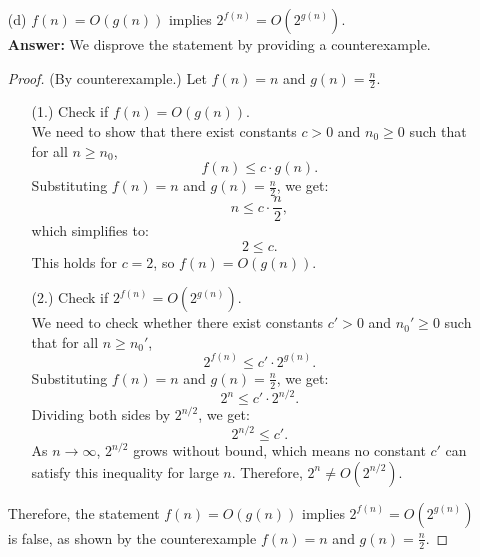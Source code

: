 \documentclass[12pt]{article}
\theoremstyle{plain}
\begin{document}
\begin{itemize}
\begin{proof}
            \textbf{Upper bound:} We first check if the upper bound \( n + n^2 \leq c_2 \cdot n \) holds for large \( n \). For large \( n \), \( n^2 \) dominates \( n \), so \( n + n^2 \) grows like \( n^2 \), which cannot be bounded by \( c_2 \cdot n \) for any constant \( c_2 \). Therefore, the upper bound fails.

            \textbf{Lower bound:} The lower bound \( n + n^2 \geq c_1 \cdot n \) holds for sufficiently large \( n \), since \( n^2 \) is positive and dominates \( n \), ensuring that \( n + n^2 \geq c_1 \cdot n \).

            Since the upper bound fails, we conclude that \( f(n) + g(n) \neq \Theta(\min(f(n), g(n))) \). Therefore, the original statement is false.
        \end{proof}
        \newpage

    \item[(d)] $f(n)= O(g(n))$ implies $2^{f(n)} = O(2^{g(n)}).$ \\
        \textbf{Answer:} We disprove the statement by providing a counterexample.
        \begin{proof} (By counterexample.) Let \( f(n) = n \) and \( g(n) = \frac{n}{2} \).
        \begin{itemize}
            \item[(1.)] Check if \( f(n) = O(g(n)) \). \\
            We need to show that there exist constants \( c > 0 \) and \( n_0 \geq 0 \) such that for all \( n \geq n_0 \),
            \[ f(n) \leq c \cdot g(n). \] 
            Substituting \( f(n) = n \) and \( g(n) = \frac{n}{2} \), we get:
            \[ n \leq c \cdot \frac{n}{2}, \]
            which simplifies to:
            \[ 2 \leq c. \]
            This holds for \( c = 2 \), so \( f(n) = O(g(n)) \).
            \item[(2.)] Check if \( 2^{f(n)} = O(2^{g(n)}) \). \\
            We need to check whether there exist constants \( c' > 0 \) and \( n_0' \geq 0 \) such that for all \( n \geq n_0' \),
            \[ 2^{f(n)} \leq c' \cdot 2^{g(n)}. \]
            Substituting \( f(n) = n \) and \( g(n) = \frac{n}{2} \), we get:
            \[ 2^n \leq c' \cdot 2^{n/2}. \]
            Dividing both sides by \( 2^{n/2} \), we get:
            \[ 2^{n/2} \leq c'. \]
            As \( n \to \infty \), \( 2^{n/2} \) grows without bound, which means no constant \( c' \) can satisfy this inequality for large \( n \). Therefore, \( 2^n \neq O(2^{n/2}) \).
        \end{itemize}
        Therefore, the statement $f(n)= O(g(n))$ implies $2^{f(n)} = O(2^{g(n)})$ is false, as shown by the counterexample \( f(n) = n \) and \( g(n) = \frac{n}{2} \).
        \end{proof}
        \newpage
    

\end{itemize}
\end{document}
